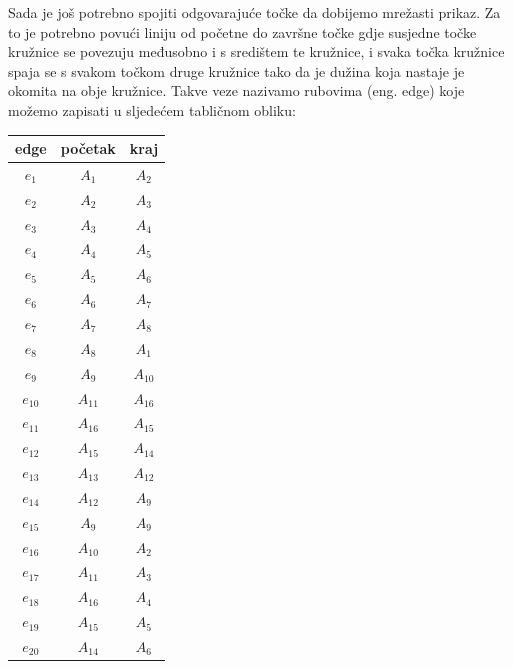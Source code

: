 \documentclass[a4paper,12pt]{article}
\begin{document}
\newpage
Sada je još potrebno spojiti odgovarajuće točke da dobijemo mrežasti prikaz. 
Za to je potrebno povući liniju od početne do završne točke gdje susjedne točke kružnice se povezuju međusobno i s središtem te kružnice,
i svaka točka kružnice spaja se s svakom točkom druge kružnice tako da je dužina koja nastaje je okomita na obje kružnice.
Takve veze nazivamo rubovima (eng. edge) koje možemo zapisati u sljedećem tabličnom obliku:
    \begin{center}
        \renewcommand{\arraystretch}{0.7}
        \begin{tabular}{||c | c | c ||} 
         \hline
         edge & početak & kraj  \\ [0.5ex] 
         \hline
         $e_1$ & $A_{1}$ & $A_{2}$ \\ 
         \hline
         $e_2$ & $A_{2}$ & $A_{3}$  \\
         \hline
         $e_3$ & $A_{3}$ & $A_{4}$  \\
         \hline
         $e_4$ & $A_{4}$ & $A_{5}$  \\
         \hline
         $e_5$ & $A_{5}$ & $A_{6}$ \\ 
         \hline
         $e_6$ & $A_{6}$ & $A_{7}$  \\
         \hline
         $e_7$ & $A_{7}$ & $A_{8}$  \\
         \hline
         $e_8$ & $A_{8}$  & $A_{1}$ \\
         \hline
         $e_9$ & $A_{9}$ & $A_{10}$  \\
         \hline
         $e_{10}$& $A_{11}$ & $A_{16}$ \\
         \hline
         $e_{11}$ & $A_{16}$ & $A_{15}$   \\
         \hline
         $e_{12}$ & $A_{15}$ & $A_{14}$  \\
         \hline
         $e_{13}$ & $A_{13}$ & $A_{12}$   \\ 
         \hline
         $e_{14}$ & $A_{12}$ & $A_{9}$  \\
         \hline
         $e_{15}$ & $A_{9}$ & $A_{9}$  \\
         \hline
         $e_{16}$ & $A_{10}$ & $A_{2}$  \\
         \hline
         $e_{17}$ & $A_{11}$  & $A_{3}$ \\
         \hline
         $e_{18}$ & $A_{16}$ & $A_{4}$ \\ 
         \hline
         $e_{19}$& $A_{15}$ & $A_{5}$ \\
         \hline
         $e_{20}$ & $A_{14}$ & $A_{6}$   \\

\end{tabular}
\end{center}
\end{document}
